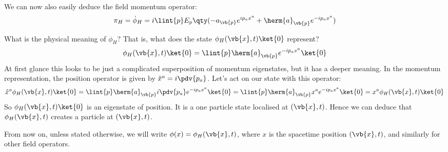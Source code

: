 \documentclass{jknotes} %
\begin{document}
We can now also easily deduce the field momentum operator:
\begin{equation}
    \pi_H = \dot\phi_H = i \lint{p} E_p \qty(-a_{\vb{p}}e^{ip_ax^a} + \herm{a}_{\vb{p}}e^{-ip_ax^a})
\end{equation}

What is the physical meaning of \(\phi_H\)? That is, what does the state \(\phi_H(\vb{x},t)\ket{0}\) represent?
\begin{equation}
    \phi_H(\vb{x},t)\ket{0} = \lint{p} \herm{a}_{\vb{p}} e^{-ip_ax^a}\ket{0}
\end{equation}
At first glance this looks to be just a complicated superposition of momentum eigenstates, but it has a deeper meaning. In the momentum representation, the position operator is given by \(\hat{x}^a = i\pdv{p_a}\). Let's act on our state with this operator:
\begin{equation}
    \hat{x}^a\phi_H(\vb{x},t)\ket{0} = \lint{p}\herm{a}_{\vb{p}} i\pdv{p_a} e^{-ip_ax^a}\ket{0} = \lint{p}\herm{a}_{\vb{p}} x^ae^{-ip_ax^a}\ket{0} = x^a\phi_H(\vb{x},t)\ket{0}
\end{equation}
So \(\phi_H(\vb{x},t)\ket{0}\) is an eigenstate of position. It is a one particle state localised at \((\vb{x},t)\). Hence we can deduce that \(\phi_H(\vb{x},t)\) creates a particle at \((\vb{x},t)\).

From now on, unless stated otherwise, we will write \(\phi(x)=\phi_H(\vb{x},t)\), where \(x\) is the spacetime position \((\vb{x},t)\), and similarly for other field operators.
\end{document}
